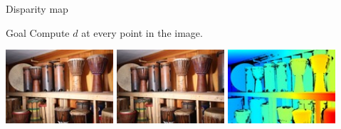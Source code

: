 \documentclass{beamer}
\begin{document}
\begin{frame}{Disparity map}
    \begin{block}{Goal}
        Compute $d$ at every point in the image.
    \end{block}
    \vspace{1em}
    \centering
    \includegraphics[width=0.3\textwidth]{images/im0.jpg}
    \includegraphics[width=0.3\textwidth]{images/im1.jpg}
    \includegraphics[width=0.3\textwidth]{images/disp0.jpg}
\end{frame}
\end{document}
